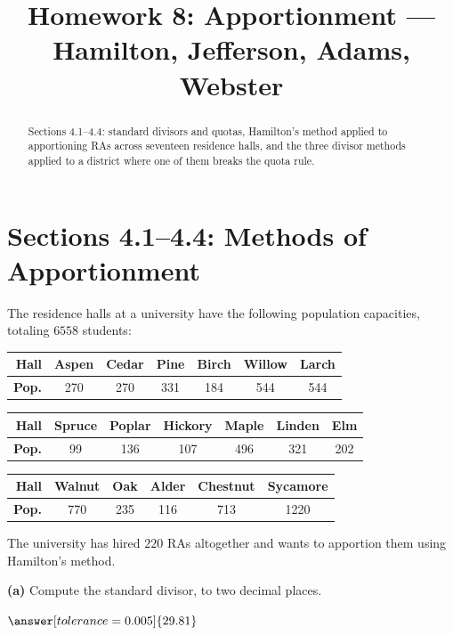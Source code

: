 \documentclass[12pt]{ximera}
\title{Homework 8: Apportionment --- Hamilton, Jefferson, Adams, Webster}
\begin{document}
\begin{abstract}
Sections 4.1--4.4: standard divisors and quotas, Hamilton's method applied to
apportioning RAs across seventeen residence halls, and the three divisor methods
applied to a district where one of them breaks the quota rule.
\end{abstract}
\maketitle

\section*{Sections 4.1--4.4: Methods of Apportionment}

\begin{problem}
The residence halls at a university have the following population capacities,
totaling $6558$ students:

\begin{center}
\begin{tabular}{r|c|c|c|c|c|c}
\textbf{Hall} & Aspen & Cedar & Pine & Birch & Willow & Larch \\\hline
\textbf{Pop.} & 270 & 270 & 331 & 184 & 544 & 544 \\
\end{tabular}

\smallskip
\begin{tabular}{r|c|c|c|c|c|c}
\textbf{Hall} & Spruce & Poplar & Hickory & Maple & Linden & Elm \\\hline
\textbf{Pop.} & 99 & 136 & 107 & 496 & 321 & 202 \\
\end{tabular}

\smallskip
\begin{tabular}{r|c|c|c|c|c}
\textbf{Hall} & Walnut & Oak & Alder & Chestnut & Sycamore \\\hline
\textbf{Pop.} & 770 & 235 & 116 & 713 & 1220 \\
\end{tabular}
\end{center}

The university has hired $220$ RAs altogether and wants to apportion them using
Hamilton's method.

\begin{prompt}
\textbf{(a)} Compute the standard divisor, to two decimal places.

$\answer[tolerance=0.005]{29.81}$


\end{prompt}
\end{problem}
\end{document}
